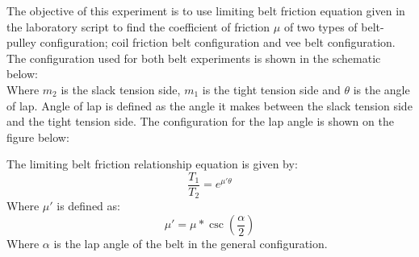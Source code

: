The objective of this experiment is to use limiting belt friction equation given in the laboratory script to find the coefficient of friction $\mu$ of two types of belt-pulley configuration; coil friction belt configuration and vee belt configuration. The configuration used for both belt experiments is shown in the schematic below: \\

Where $m_2$ is the slack tension side, $m_1$ is the tight tension side and $\theta$ is the angle of lap. Angle of lap is defined as the angle it makes between the slack tension side and the tight tension side. The configuration for the lap angle is shown on the figure below:


The limiting belt friction relationship equation is given by:
\begin{equation}
\frac{T_1}{T_2} = e^{\mu'\theta}
\end{equation}
Where $\mu'$ is defined as:
\begin{equation}
\mu' = \mu*\csc\left(\frac{\alpha}{2}\right)
\end{equation}
Where $\alpha$ is the lap angle of the belt in the general configuration.